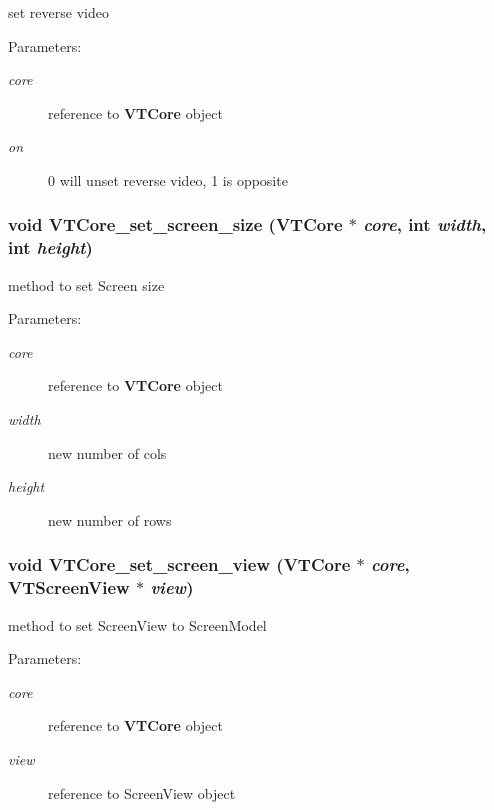 set reverse video

\begin{Desc}
\item[Parameters:]
\begin{description}
\item[{\em core}]reference to {\bf VTCore} object \item[{\em on}]0 will unset reverse video, 1 is opposite \end{description}
\end{Desc}
\subsubsection{\setlength{\rightskip}{0pt plus 5cm}void VTCore\_\-set\_\-screen\_\-size ({\bf VTCore} $\ast$ {\em core}, int {\em width}, int {\em height})}\label{core_8h_a51}


method to set Screen size

\begin{Desc}
\item[Parameters:]
\begin{description}
\item[{\em core}]reference to {\bf VTCore} object \item[{\em width}]new number of cols \item[{\em height}]new number of rows \end{description}
\end{Desc}
\subsubsection{\setlength{\rightskip}{0pt plus 5cm}void VTCore\_\-set\_\-screen\_\-view ({\bf VTCore} $\ast$ {\em core}, {\bf VTScreen\-View} $\ast$ {\em view})}\label{core_8h_a50}


method to set Screen\-View to Screen\-Model

\begin{Desc}
\item[Parameters:]
\begin{description}
\item[{\em core}]reference to {\bf VTCore} object \item[{\em view}]reference to Screen\-View object \end{description}
\end{Desc}
